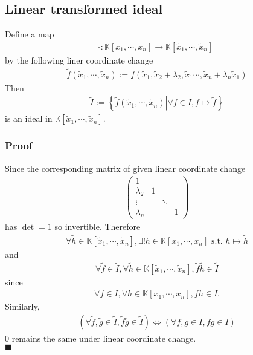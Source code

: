 \documentclass[11pt]{book}
\begin{document}
\subsection{Linear transformed ideal}
\label{LinearTransformedIdeal}
Define a map
\begin{eqnarray}
\tilde{} : \mathbb{K}[x_1, \cdots, x_n] \to \mathbb{K}[\tilde{x}_1, \cdots, \tilde{x}_n] 
\end{eqnarray}
by the following liner coordinate change
\begin{eqnarray}
\tilde{f}(\tilde{x}_1, \cdots, \tilde{x}_n) := f(\tilde{x}_1,\tilde{x}_2 + \lambda_2, \tilde{x}_1 \cdots,  \tilde{x}_n + \lambda_n \tilde{x}_1)
\end{eqnarray}
Then
\begin{eqnarray}
\tilde{I} := \left\{\left. \tilde{f}(\tilde{x}_1, \cdots, \tilde{x}_n) \right| \forall f \in I, f \mapsto \tilde{f} \right\}
\end{eqnarray}
is an ideal in $\mathbb{K}[\tilde{x}_1, \cdots, \tilde{x}_n]$.

\subsubsection{Proof}
Since the corresponding matrix of given linear coordinate change
\begin{eqnarray}
\left(\begin{array}{cccc}1 &   &   &   \\ \lambda_2 &  1 &   &   \\  \vdots &   &  \ddots &   \\  \lambda_n &   &   & 1 \end{array}\right)
\end{eqnarray}
has $\det = 1$ so invertible.
Therefore 
\begin{eqnarray}
\forall \tilde{h} \in \mathbb{K}[\tilde{x}_1, \cdots, \tilde{x}_n], \exists! h \in \mathbb{K}[x_1, \cdots, x_n] \text{ s.t. } h \mapsto \tilde{h}
\end{eqnarray}
and
\begin{eqnarray}
\forall \tilde{f} \in \tilde{I}, \forall \tilde{h} \in \mathbb{K}[\tilde{x}_1, \cdots, \tilde{x}_n], \tilde{f} \tilde{h} \in \tilde{I}
\end{eqnarray}
since
\begin{eqnarray}
\forall f \in I, \forall h \in \mathbb{K}[x_1, \cdots, x_n], fh \in I.
\end{eqnarray}
Similarly, 
\begin{eqnarray}
(\forall \tilde{f}, \tilde{g} \in \tilde{I}, \tilde{f} \tilde{g} \in \tilde{I})
\Leftrightarrow 
(\forall f,g \in I, fg \in I)
\end{eqnarray}
$0$ remains the same under linear coordinate change.\\
$\blacksquare$
\end{document}
